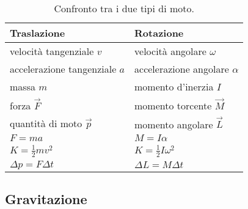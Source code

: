 \documentclass[a4paper,11pt,italian]{article}
\begin{document}
\begin{description}
  \begin{table}[htp]\centering
    \begin{tabular}{ll}\toprule
     \textbf{Traslazione} & \textbf{Rotazione} \\\midrule
     velocità tangenziale $ v $ & velocità angolare $ \omega $ \\\addlinespace[.2em]
     accelerazione tangenziale $ a $ & accelerazione angolare $ \alpha $\\\addlinespace[.2em]
     massa $ m $ & momento d'inerzia $ I $\\\addlinespace[.2em]
     forza $ \vec{F} $ & momento torcente $ \vec{M} $\\\addlinespace[.2em]
     quantità di moto $ \vec{p} $ & momento angolare $ \vec{L} $\\\addlinespace[.2em]
     $ F = ma $ & $ M = I \alpha  $ \\\addlinespace[.2em]
     $ K = \frac{1}{2}mv^2 $ & $ K = \frac{1}{2} I\omega^2 $ \\\addlinespace[.2em]
     $ \Delta p = F\Delta t $ & $ \Delta L = M\Delta t $\\\bottomrule
    \end{tabular}
    \caption{Confronto tra i due tipi di moto.}
    \label{tab:traslazionalirotazionali}
  \end{table}  
  
\end{description}


\subsection{Gravitazione}
\end{document}
